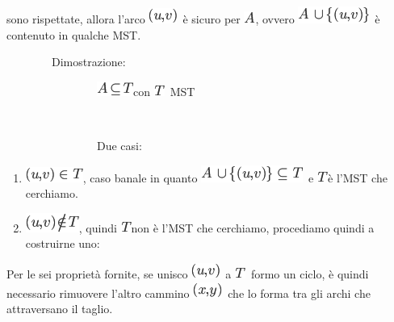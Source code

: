 \documentclass{article}
\providecommand{\tightlist}{%
  \setlength{\itemsep}{0pt}\setlength{\parskip}{0pt}}
\begin{document}
{sono rispettate, allora l'arco
}\includegraphics{images/image449.png}{~è }{sicuro }{per
}\includegraphics{images/image73.png}{, ovvero
}\includegraphics{images/image450.png}{~è contenuto in qualche MST.}

{}

{~~~~~~~~}{Dimostrazione}{:}

{~~~~~~~~~~~~~~~~}\includegraphics{images/image451.png}{con
}\includegraphics{images/image37.png}{~MST}

{~~~~~~~~~~~~~~~~}

{~~~~~~~~~~~~~~~~Due casi:}

\begin{enumerate}
\tightlist
\item
  \includegraphics{images/image452.png}{, caso banale in quanto
  }\includegraphics{images/image453.png}{~e
  }\includegraphics{images/image37.png}{è l'MST che cerchiamo.}
\item
  \includegraphics{images/image454.png}{, quindi
  }\includegraphics{images/image37.png}{non è l'MST che cerchiamo,
  procediamo quindi a costruirne uno:}
\end{enumerate}

{Per le sei proprietà fornite, se unisco
}\includegraphics{images/image449.png}{~a
}\includegraphics{images/image37.png}{~formo un ciclo, è quindi
necessario rimuovere l'altro cammino
}\includegraphics{images/image455.png}{~che lo forma tra gli archi che
attraversano il taglio. }
\end{document}
